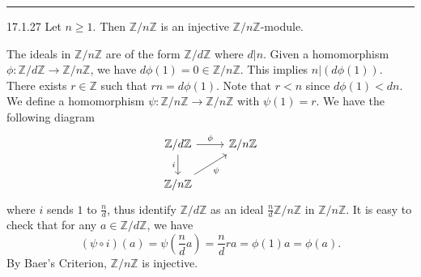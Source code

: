 \documentclass[a4paper, 12pt]{article}
\begin{document}
\noindent\rule{7in}{2.8pt}
\begin{problem}{17.1.27}
Let \(n\geq 1\). Then \(\mathbb{Z}/n \mathbb{Z}\) is an injective \(\mathbb{Z}/n \mathbb{Z}\)-module.
\end{problem}
\begin{solution}
The ideals in \(\mathbb{Z}/n \mathbb{Z}\) are of the form \(\mathbb{Z}/d \mathbb{Z}\) where \(d|n\). Given a homomorphism \(\phi: \mathbb{Z}/d \mathbb{Z}\rightarrow \mathbb{Z}/n \mathbb{Z}\), we have \(d\phi(1)=0\in \mathbb{Z}/n \mathbb{Z}\). This implies 
\(n|(d\phi(1))\). There exists \(r\in \mathbb{Z}\) such that \(rn=d\phi(1)\). Note that \(r<n\) since \(d\phi(1)<dn\). We define a homomorphism \(\psi:\mathbb{Z}/n \mathbb{Z}\rightarrow \mathbb{Z}/n \mathbb{Z}\) with \(\psi(1)=r\). We have the following diagram 
\[\begin{tikzcd}
	{\mathbb{Z}/d\mathbb{Z}} & {\mathbb{Z}/n\mathbb{Z}} \\
	{\mathbb{Z}/n\mathbb{Z}}
	\arrow["\phi", from=1-1, to=1-2]
	\arrow["i"', from=1-1, to=2-1]
	\arrow["\psi"', from=2-1, to=1-2]
\end{tikzcd}\]
where \(i\) sends \(1\) to \(\frac{n}{d}\), thus identify \(\mathbb{Z}/d \mathbb{Z}\) as an ideal \(\frac{n}{d} \mathbb{Z}/n \mathbb{Z}\) in \(\mathbb{Z}/n \mathbb{Z}\). It is easy to check that for  any \(a\in \mathbb{Z}/d \mathbb{Z}\), we have 
\[(\psi\circ i)(a)=\psi(\frac{n}{d}a)=\frac{n}{d}ra=\phi(1)a=\phi(a).\]
By Baer's Criterion, \(\mathbb{Z}/n \mathbb{Z}\) is injective.
\end{solution}
\end{document}
